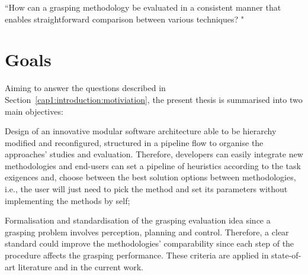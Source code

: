 \begin{flushright}

``How can a grasping methodology be evaluated in a consistent manner that enables straightforward comparison between various techniques? "
\end{flushright}



\section{Goals}

Aiming to answer the questions described in Section~\ref{cap1:introduction:motiviation}, the present thesis is summarised into two main objectives:


\begin{itemize_jp}

    \item Design of an innovative modular software architecture able to be hierarchy modified and reconfigured, structured in a pipeline flow to organise the approaches' studies and evaluation. Therefore, developers can easily integrate new methodologies and end-users can set a pipeline of heuristics according to the task exigences and, choose between the best solution options between methodologies, i.e., the user will just need to pick the method and set its parameters without implementing the methods by self; 

    \item Formalisation and standardisation of the grasping evaluation idea since a grasping problem involves perception, planning and control. Therefore, a clear standard could improve the methodologies' comparability since each step of the procedure affects the grasping performance. These criteria are applied in state-of-art literature and in the current work.

    
\end{itemize_jp}

